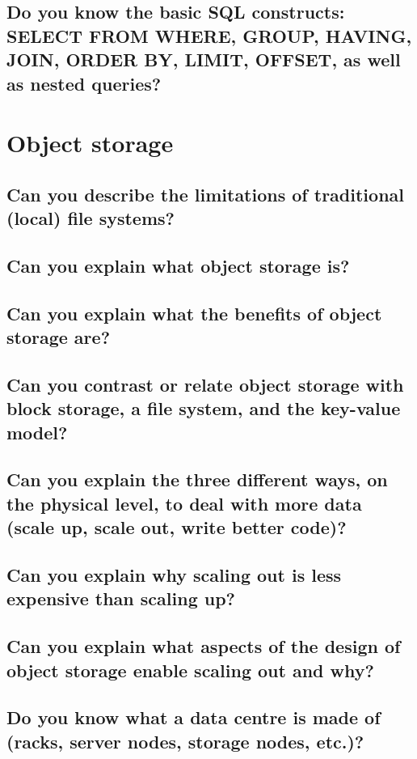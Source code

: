 \documentclass{article}
\begin{document}
\subsection{Do you know the basic SQL constructs: SELECT FROM WHERE, GROUP, HAVING, JOIN, ORDER BY, LIMIT, OFFSET, as well as nested queries?}

\pagebreak

\section{Object storage}
\subsection{Can you describe the limitations of traditional (local) file systems?}
\subsection{Can you explain what object storage is?}
\subsection{Can you explain what the benefits of object storage are?}
\subsection{Can you contrast or relate object storage with block storage, a file system, and the key-value model?}
\subsection{Can you explain the three different ways, on the physical level, to deal with more data (scale up, scale out, write better code)?}
\subsection{Can you explain why scaling out is less expensive than scaling up?}
\subsection{Can you explain what aspects of the design of object storage enable scaling out and why?}
\subsection{Do you know what a data centre is made of (racks, server nodes, storage nodes, etc.)?}
\end{document}

